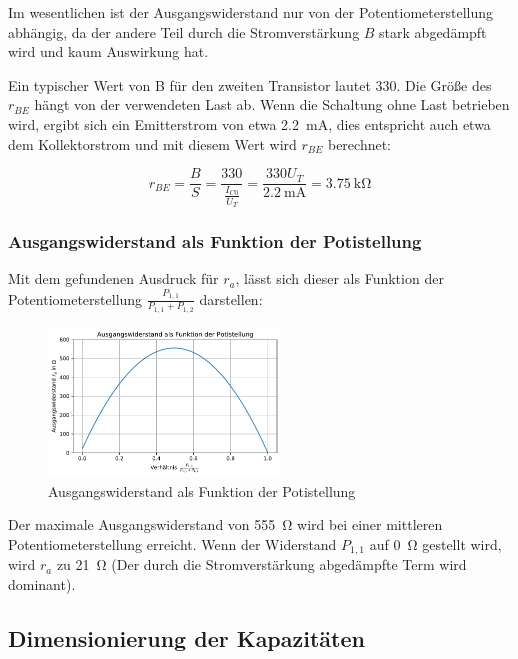 Im wesentlichen ist der Ausgangswiderstand nur von der Potentiometerstellung abhängig, da der andere Teil durch die Stromverstärkung $B$ stark abgedämpft wird und kaum Auswirkung hat.

Ein typischer Wert von B für den zweiten Transistor lautet 330. Die Größe des $r_{BE}$ hängt von der verwendeten Last ab. Wenn die Schaltung ohne Last betrieben wird, ergibt sich ein Emitterstrom von etwa \SI{2.2}{\milli \ampere}, dies entspricht auch etwa dem Kollektorstrom und mit diesem Wert wird $r_{BE}$ berechnet:

\begin{equation*}
    r_{BE} = \frac{B}{S} = \frac{330}{\frac{I_{C0}}{U_T}} = \frac{330 U_T}{\SI{2.2}{\milli \ampere}} = \SI{3.75}{\kilo \ohm}
\end{equation*}

\subsubsection{Ausgangswiderstand als Funktion der Potistellung}

Mit dem gefundenen Ausdruck für $r_a$, lässt sich dieser als Funktion der Potentiometerstellung $\frac{P_{1,1}}{P_{1,1}+P_{1,2}}$ darstellen:

\begin{figure}[H]
    \centering
    \includegraphics[width = 0.55\textwidth]{tex/1_Microphone/pictures/simple_plot.pdf}
    \caption{Ausgangswiderstand als Funktion der Potistellung}
    \label{fig:my_label}
\end{figure}

Der maximale Ausgangswiderstand von \SI{555}{\ohm} wird bei einer mittleren Potentiometerstellung erreicht. Wenn der Widerstand $P_{1,1}$ auf \SI{0}{\ohm} gestellt wird, wird $r_a$ zu \SI{21}{\ohm} (Der durch die Stromverstärkung abgedämpfte Term wird dominant).

\subsection{Dimensionierung der Kapazitäten}

